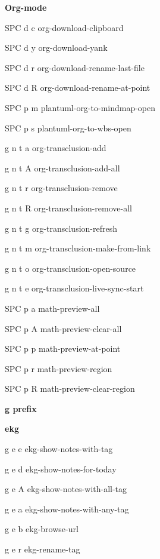 \documentclass[10pt]{article}
\renewcommand\section[1]{\bigskip\par\textbf{\color{heading}\large#1}\smallskip}
\renewcommand\subsection[1]{\smallskip\par\textbf{\color{heading}#1}}
\begin{document}
\begin{multicols}{4}
  \subsection{Org-mode}
  \begin{keylist}
    \item[SPC d c] org-download-clipboard
    \item[SPC d y] org-download-yank
    \item[SPC d r] org-download-rename-last-file
    \item[SPC d R] org-download-rename-at-point
    \item[SPC p m] plantuml-org-to-mindmap-open
    \item[SPC p s] plantuml-org-to-wbs-open
    \item[g n t a] org-transclusion-add
    \item[g n t A] org-transclusion-add-all
    \item[g n t r] org-transclusion-remove
    \item[g n t R] org-transclusion-remove-all
    \item[g n t g] org-transclusion-refresh
    \item[g n t m] org-transclusion-make-from-link
    \item[g n t o] org-transclusion-open-source
    \item[g n t e] org-transclusion-live-sync-start
    \item[SPC p a] math-preview-all
    \item[SPC p A] math-preview-clear-all
    \item[SPC p p] math-preview-at-point
    \item[SPC p r] math-preview-region
    \item[SPC p R] math-preview-clear-region
  \end{keylist}

  \section{g prefix}
  \subsection{ekg}
  \begin{keylist}
    \item[g e e] ekg-show-notes-with-tag
    \item[g e d] ekg-show-notes-for-today
    \item[g e A] ekg-show-notes-with-all-tag
    \item[g e a] ekg-show-notes-with-any-tag
    \item[g e b] ekg-browse-url
    \item[g e r] ekg-rename-tag
  \end{keylist}

\end{multicols}
\end{document}

